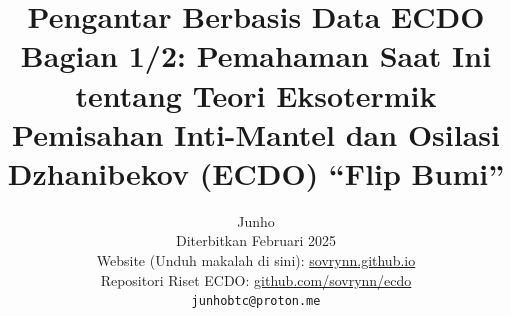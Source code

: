 \documentclass[10pt,twocolumn,letterpaper]{article}
\begin{document}
\title{Pengantar Berbasis Data ECDO Bagian 1/2: Pemahaman Saat Ini tentang Teori Eksotermik Pemisahan Inti-Mantel dan Osilasi Dzhanibekov (ECDO) “Flip Bumi”}

\author{Junho\\
Diterbitkan Februari 2025\\
Website (Unduh makalah di sini): \href{https://sovrynn.github.io}{sovrynn.github.io}\\
Repositori Riset ECDO: \href{https://github.com/sovrynn/ecdo}{github.com/sovrynn/ecdo}\\
{\tt\small junhobtc@proton.me}
}

\maketitle
\end{document}
